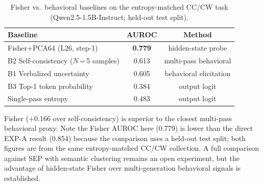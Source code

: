 \documentclass[11pt]{article}
\begin{document}
\begin{table}[h!]
\centering
\caption{Fisher vs.\ behavioral baselines on the entropy-matched CC/CW task
  (Qwen2.5-1.5B-Instruct; held-out test split).}
\begin{tabular}{lcc}
\toprule
Baseline & AUROC & Method \\
\midrule
Fisher+PCA64 (L26, step-1) & \textbf{0.779} & hidden-state probe \\
B2 Self-consistency ($N$\,=\,5 samples) & 0.613 & multi-pass behavioral \\
B1 Verbalized uncertainty & 0.605 & behavioral elicitation \\
B3 Top-1 token probability & 0.384 & output logit \\
Single-pass entropy & 0.483 & output logit \\
\bottomrule
\end{tabular}
\end{table}

Fisher ($+$0.166 over self-consistency) is superior to the closest multi-pass behavioral
proxy. Note the Fisher AUROC here (0.779) is lower than the direct EXP-A result (0.854)
because the comparison uses a held-out test split; both figures are from the same
entropy-matched CC/CW collection. A full comparison against SEP with semantic clustering
remains an open experiment, but the advantage of hidden-state Fisher over multi-generation
behavioral signals is established.
\end{document}
